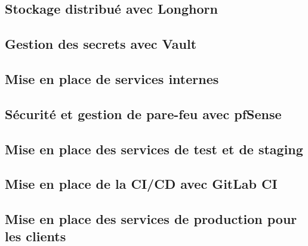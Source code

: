 \subsection{Stockage distribué avec Longhorn}


\subsection{Gestion des secrets avec Vault}


\subsection{Mise en place de services internes}


\subsection{Sécurité et gestion de pare-feu avec pfSense}


\subsection{Mise en place des services de test et de staging}


\subsection{Mise en place de la CI/CD avec GitLab CI}


\subsection{Mise en place des services de production pour les clients}


